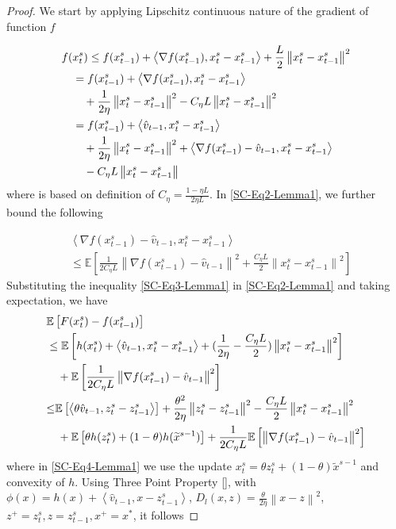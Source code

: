\documentclass{article}
\newcommand*{\E}{\mathbb{E}}
\newcommand{\norm}[1]{\left\lVert#1\right\rVert}
\newcommand{\Iprod}[2]{\left\langle #1,#2\right\rangle}
\theoremstyle{definition}
\theoremstyle{remark}
\begin{document}
{
\begin{proof}
We start by applying Lipschitz continuous nature of the gradient of function $f$ 

\begin{align}
f(&x_{t}^s)  \leq f(x_{t-1}^s) + \Iprod{\nabla f(x_{t-1}^s)}{x_{t}^s-x_{t-1}^s}+\frac{L}{2}\norm{x_{t}^s-x_{t-1}^s}^2\notag\\
&=f(x_{t-1}^s) + \Iprod{\nabla f(x_{t-1}^s)}{x_{t}^s-x_{t-1}^s}\notag\\
&~~~+ {\frac{1 }{2\eta}}\norm{x_{t}^s-x_{t-1}^s}^2-{C_{\eta} L}\norm{x_{t}^s-x_{t-1}^s}^2\label{SC-Eq1-Lemma1}\\
&= f(x_{t-1}^s) + \Iprod{\hat{v}_{t-1}}{x_{t}^s-x_{t-1}^s}\notag\\
&~~~+ { \frac{1}{2\eta}}\norm{x_{t}^s-x_{t-1}^s}^2+\Iprod{\nabla f(x_{t-1}^s)-\hat{v}_{t-1}}{x_{t}^s-x_{t-1}^s}\notag\\
&~~~-{C_{\eta} L}\norm{x_{t}^s-x_{t-1}^s}\label{SC-Eq2-Lemma1}
\end{align}
where \label{SC-Eq1-Lemma1} is based on definition of $C_{\eta} = \frac{1-\eta L}{2\eta L}$. 
In \eqref{SC-Eq2-Lemma1}, we further bound the following

\begin{equation}\label{SC-Eq3-Lemma1}
\begin{split}
&\Iprod{\nabla f(x_{t-1}^s)-\hat{v}_{t-1}}{x_{t}^s-x_{t-1}^s}\\
&{\leq} \E\left[\frac{1}{2C_{\eta} L}\norm{\nabla f(x_{t-1}^s)-\hat{v}_{t-1}}^2 + \frac{C_{\eta} L}{2}\norm{x_{t}^s-x_{t-1}^s}^2\right]
\end{split}
\end{equation}
Substituting the inequality \eqref{SC-Eq3-Lemma1} in \eqref{SC-Eq2-Lemma1} and taking expectation, we have
\begin{align}
&\E \left[ F(x_{t}^s) -f(x_{t-1}^s)\right]\notag\\
&\leq \E\left[h(x_{t}^s)+ \Iprod{\hat{v}_{t-1}}{x_{t}^s-x_{t-1}^s}+{(\frac{1}{2\eta}-\frac{C_{\eta} L}{2})}\norm{x_{t}^s-x_{t-1}^s}^2\right]\notag\\
&~~~+\E\left[\frac{1}{2C_{\eta} L}\norm{\nabla f(x_{t-1}^s)-\hat{v}_{t-1}}^2\right]\notag\\
&{\leq}\E\left[\Iprod{\theta\hat{v}_{t-1}}{z_{t}^s-z_{t-1}^s}\right]+{\frac{{ \theta^2}}{2\eta}}\norm{z_{t}^s-z_{t-1}^s}^2-\frac{C_{\eta} L}{2}\norm{x_{t}^s-x_{t-1}^s}^2\notag\\
&~~~+\E\left[\theta h(z_{t}^s)+(1-\theta) h(\widetilde{x}^{s-1})\right]+\frac{1}{2C_{\eta} L}\E\left[\norm{\nabla f(x_{t-1}^s)-\hat{v}_{t-1}}^2\right]\label{SC-Eq4-Lemma1}
\end{align}
where in \eqref{SC-Eq4-Lemma1} we use the update $x_t^s = \theta z_t^s+(1-\theta)\widetilde{x}^{s-1}$ and convexity of $h$. Using Three Point Property \ref{}, with $\phi(x) = h(x)+\Iprod{\hat{v}_{t-1}}{x-z_{t-1}^s}$, $D_l(x,z) = {\frac{\theta}{2\eta}}\norm{x-z}^2$, $z^+ = z_t^s, z = z_{t-1}^s, x^+ = x^*$, it follows


\end{proof}}
\end{document}
